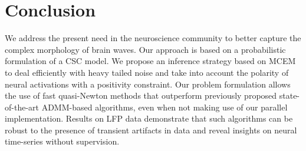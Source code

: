 
\section{Conclusion}
\label{sec:alphacsc_conclusion}

\vspace{-5pt}

We address the present need in the neuroscience community to better capture the complex morphology of brain waves. Our approach is based on a probabilistic formulation of a CSC model. We propose an inference strategy based on MCEM to deal efficiently with heavy tailed noise and take into account the polarity of neural activations with a positivity constraint. Our problem formulation allows the use of fast quasi-Newton methods that outperform previously proposed state-of-the-art ADMM-based algorithms, even when not making use of our parallel implementation. Results on LFP data demonstrate that such algorithms can be robust to the presence of transient artifacts in data and reveal insights on neural time-series without supervision.